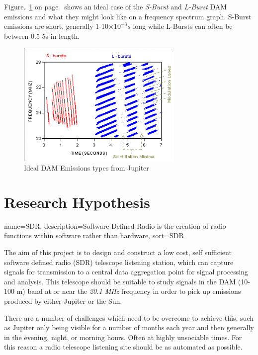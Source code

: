 Figure.~\ref{fig:dam_emissions_spectrum} on page~\pageref{fig:dam_emissions_spectrum} shows an ideal case of the \textit{S-Burst} and \textit{L-Burst} \gls{DAM} emissions and what they might look like on a frequency spectrum graph. S-Burst emissions are short, generally 1-10$\times10^{-3}s$ long while L-Bursts can often be between 0.5-5s in length.

%
\begin{figure}[here]
\centering
\includegraphics[width=8cm]{images/05}
\caption{Ideal DAM Emissions types from Jupiter \citep{wilkinson94}}
\label{fig:dam_emissions_spectrum}
\end{figure}
%

%
\newpage
\section*{Research Hypothesis}
%
{
  name={SDR},
  description={Software Defined Radio is the creation of radio functions within software rather than hardware},
  sort=SDR
}

The aim of this project is to design and construct a low cost, self sufficient software defined radio (\gls{SDR}) telescope listening station, which can capture signals for transmission to a central data aggregation point for signal processing and analysis. This telescope should be suitable to study signals  in the \gls{DAM} (10-100 m) band at or near the \textit{20.1 MHz} frequency in order to pick up emissions produced by either Jupiter or the Sun.

There are a number of challenges which need to be overcome to achieve this, such as Jupiter only being visible for a number of months each year and then generally in the evening, night, or morning hours. Often at highly unsociable times. For this reason a radio telescope listening site should be as automated as possible.

